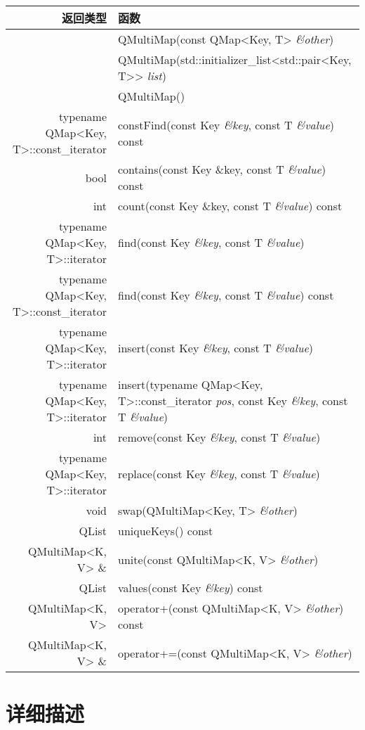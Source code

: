 \begin{longtable}[l]{|r|m{28em}|}   
    \hline
    返回类型 	& 函数 \\
    \hline
    &QMultiMap(const QMap<Key, T> \emph{\&other}) \\
    \hline 
	&QMultiMap(std::initializer\_list<std::pair<Key, T>> \emph{list})\\
    \hline
	&QMultiMap() \\
    \hline
typename QMap<Key, T>::const\_iterator &	constFind(const Key \emph{\&key}, const T \emph{\&value}) const \\
\hline
bool 	& contains(const Key \&key, const T \emph{\&value}) const\\
\hline
int 	& count(const Key \&key, const T \emph{\&value}) const\\
\hline
typename QMap<Key, T>::iterator 	& find(const Key \emph{\&key}, const T \emph{\&value})\\
\hline
typename QMap<Key, T>::const\_iterator &	find(const Key \emph{\&key}, const T \emph{\&value}) const\\
\hline
typename QMap<Key, T>::iterator &insert(const Key \emph{\&key}, const T \emph{\&value})\\
\hline
typename QMap<Key, T>::iterator & insert(typename QMap<Key, T>::const\_iterator \emph{pos}, const Key \emph{\&key}, const T \emph{\&value}) \\
\hline
int &	remove(const Key \emph{\&key}, const T \emph{\&value}) \\
\hline
typename QMap<Key, T>::iterator &	replace(const Key \emph{\&key}, const T \emph{\&value}) \\
\hline
void 	&swap(QMultiMap<Key, T> \emph{\&other})\\
\hline
QList &	uniqueKeys() const \\
\hline
QMultiMap<K, V> \& &	unite(const QMultiMap<K, V> \emph{\&other}) \\
\hline
QList &	values(const Key \emph{\&key}) const \\
\hline
QMultiMap<K, V> 	&operator+(const QMultiMap<K, V> \emph{\&other}) const \\
\hline
QMultiMap<K, V> \& &	operator+=(const QMultiMap<K, V> \emph{\&other}) \\
    \hline
\end{longtable}


\section{详细描述}

